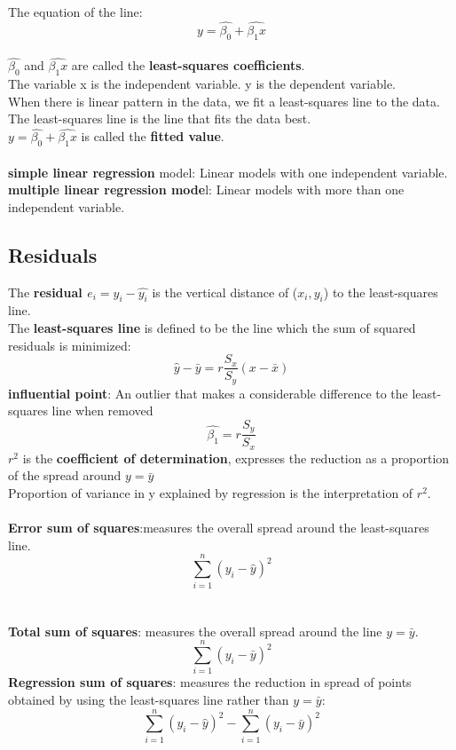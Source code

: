\documentclass[../main.tex]{subfiles}
\begin{document}
The equation of the line:
\begin{equation*}
    y=\hat{\beta_0}+\hat{\beta_1 x}
\end{equation*}\\
$\hat{\beta_0}$ and $\hat{\beta_1 x}$ are called the \textbf{least-squares coefficients}.\\
The variable x is the independent variable. y is the dependent variable.\\
When there is linear pattern in the data, we fit a least-squares line to the data. 
The least-squares line is the line that fits the data best.\\
$    y=\hat{\beta_0}+\hat{\beta_1 x} $ is called the \textbf{fitted value}.
\\\\
\textbf{simple linear regression} model: Linear models with one independent variable.\\
\textbf{multiple linear regression mode}l: Linear models with more than one independent variable.


\subsection{Residuals}
The \textbf{residual $e_i=y_i-\hat{y_i}$} is the vertical distance of ($x_i, y_i$) to the least-squares line.\\
The \textbf{least-squares line} is defined to be the line which the sum of squared residuals is minimized:
\begin{equation*}
    \hat y - \bar y = r \frac{S_x}{S_y}(x-\bar x)
\end{equation*}
\textbf{influential point}: An outlier that makes a considerable difference to the least-squares line when removed\\
\begin{equation*}
\hat{\beta_1}=r\frac{S_y}{S_x}    
\end{equation*}
$r^2$ is the \textbf{coefficient of determination}, expresses the reduction as a proportion of the spread around $y = \bar{y}$\\
Proportion of variance in y explained by regression is the interpretation of $r^2$.
\\\\
\textbf{Error sum of squares}:measures the overall spread around the least-squares line.
\begin{equation*}
    \sum_{i=1}^{n}{(y_i-\hat{y})^2}
\end{equation*}
\\\\
\textbf{Total sum of squares}: measures the overall spread around the line $y=\bar{y}$.
\begin{equation*}
    \sum_{i=1}^{n}{(y_i-\bar{y})^2}
\end{equation*}
\textbf{Regression sum of squares}: measures the reduction in spread of points obtained by using the least-squares line rather than $y=\bar{y}$:
\begin{equation*}
   \sum_{i=1}^{n}{(y_i-\hat{y})^2} - \sum_{i=1}^{n}{(y_i-\bar{y})^2}
\end{equation*}
\end{document}
